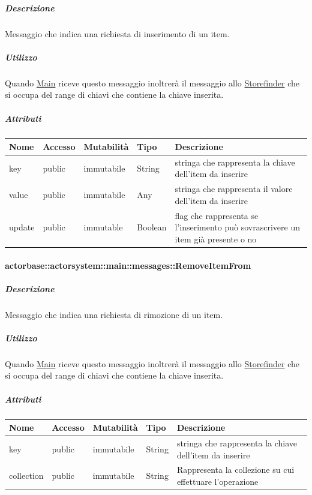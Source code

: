 \documentclass{scalatekids-article}
\begin{document}
\subparagraph{Descrizione}
Messaggio che indica una richiesta di inserimento di un item.

\subparagraph{Utilizzo}

Quando \hyperref[sec:actorbase::actorsystem::main::Main]{Main}
riceve questo messaggio inoltrerà il messaggio allo \hyperref[sec:actorbase::actorsystem::storefinder::Storefinder]{Storefinder}
che si occupa del range di chiavi che contiene la chiave inserita.

\subparagraph{Attributi}
\begin{tabular}{| p{3cm} | p{1.5cm} | p{2cm} | p{2cm} | p{8.5cm} |}
  \hline
  Nome & Accesso & Mutabilità & Tipo & Descrizione\\
  \hline
  key & public & immutabile & String & stringa che rappresenta la chiave dell'item da inserire \\
  \hline
  value & public & immutabile & Any & stringa che rappresenta il valore dell'item da inserire \\
  \hline
  update & public & immutable & Boolean & flag che rappresenta se l'inserimento può sovrascrivere un item già presente o no \\
  \hline
\end{tabular}

\paragraph{actorbase::actorsystem::main::messages::RemoveItemFrom}
\label{sec:actorbase::actorsystem::main::messages::RemoveItemFrom}

\subparagraph{Descrizione}
Messaggio che indica una richiesta di rimozione di un item.

\subparagraph{Utilizzo}
Quando \hyperref[sec:actorbase::actorsystem::main::Main]{Main}
riceve questo messaggio inoltrerà il messaggio allo \hyperref[sec:actorbase::actorsystem::storefinder::Storefinder]{Storefinder}
che si occupa del range di chiavi che contiene la chiave inserita.

\subparagraph{Attributi}
\begin{tabular}{| p{3cm} | p{1.5cm} | p{2cm} | p{2cm} | p{8.5cm} |}
  \hline
  Nome & Accesso & Mutabilità & Tipo & Descrizione\\
  \hline
  key & public & immutabile & String & stringa che rappresenta la chiave dell'item da inserire \\
  \hline
  collection & public & immutabile & String & Rappresenta la collezione su cui effettuare l'operazione \\
  \hline
\end{tabular}
\end{document}

